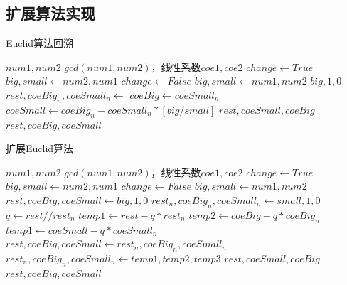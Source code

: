\documentclass[11pt]{ctexart}
\begin{document}
\subsection{扩展算法实现}
\begin{algorithm}  
    \caption{Euclid算法回溯}  
    \begin{algorithmic}[1] %
        \Require $num1, num2$  
        \Ensure $gcd(num1, num2)$，线性系数$coe1, coe2$  
                \State $change \gets True$
                \State $big, small \gets num2, num1$
            \Else
                \State $change \gets False$
                \State $big, small \gets num1, num2$
            \EndIf
                \State \Return $big, 1, 0$
            \Else
                \State $rest, coeBig_n, coeSmall_n \gets$ 
                \State $coeBig \gets coeSmall_n$
                \State $coeSmall \gets coeBig_n - coeSmall_n * [big / small]$
                    \State \Return $rest, coeSmall, coeBig$
                \Else
                    \State \Return $rest, coeBig, coeSmall$
                \EndIf 
            \EndIf  
        \EndFunction  
    \end{algorithmic}  
\end{algorithm} 
\newpage{}
\begin{algorithm}  
    \caption{扩展Euclid算法}  
    \begin{algorithmic}[1] %
        \Require $num1, num2$  
        \Ensure $gcd(num1, num2)$，线性系数$coe1, coe2$  
                \State $change \gets True$
                \State $big, small \gets num2, num1$
            \Else
                \State $change \gets False$
                \State $big, small \gets num1, num2$
            \EndIf
            \State $rest, coeBig, coeSmall \gets big, 1, 0$
            \State $rest_n, coeBig_n, coeSmall_n \gets small, 1, 0$
                \State $q \gets rest // rest_n$
                \State $temp1 \gets rest - q * rest_n$
                \State $temp2 \gets coeBig - q * coeBig_n$
                \State $temp1 \gets coeSmall - q * coeSmall_n$
                \State $rest, coeBig, coeSmall \gets rest_n, coeBig_n, coeSmall_n$
                \State $rest_n, coeBig_n, coeSmall_n \gets temp1, temp2, temp3$
            \EndWhile
                \State \Return $rest, coeSmall, coeBig$
            \Else
                \State \Return $rest, coeBig, coeSmall$
            \EndIf
        \EndFunction  
    \end{algorithmic}  
\end{algorithm} 
\end{document}
